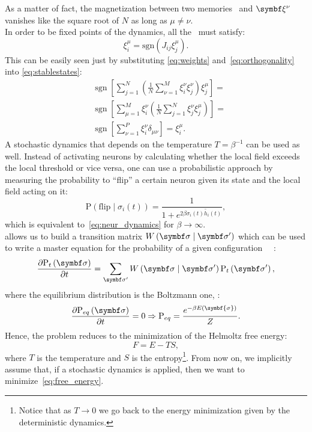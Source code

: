 \documentclass[\rootdir/main.tex]{subfiles}
\begin{document}
As a matter of fact, the magnetization between two memories \bxi\ and $\bxi[\nu]$ vanishes like the square root of $N$ as long as $\mu \neq \nu$.\\
In order to be fixed points of the dynamics, all the \bxi\ must satisfy:
\begin{equation}\label{eq:stablestates}
    \xi_i^{\mu} = \text{sgn}\left(J_{ij}\xi_j^{\mu} \right).
\end{equation}
This can be easily seen just by substituting \cref{eq:weights} and~\cref{eq:orthogonality} into \cref{eq:stablestates}:
\begin{equation}
\begin{split}
    &\operatorname{sgn}\left[\sum_{j=1}^N\left(\frac{1}{N} \sum_{\nu=1}^M \xi_i^\nu \xi_j^\nu\right) \xi_j^\mu\right] = \\
    &\operatorname{sgn}\left[\sum_{\mu=1}^M \xi_i^\nu\left(\frac{1}{N} \sum_{j=1}^N \xi_j^\nu \xi_j^\mu\right)\right] = \\
    & \operatorname{sgn}\left[\sum_{\nu=1}^P \xi_i^\nu \delta_{\mu \nu}\right] = \xi_i^{\mu}.
\end{split}
\end{equation}
A stochastic dynamics that depends on the temperature $T = \beta^{-1}$ can be used as well. Instead of activating neurons by calculating whether the local field exceeds the local threshold or vice versa, one can use a probabilistic approach by measuring the probability to ``flip'' a certain neuron given its state and the local field acting on it:
\begin{equation}\label{eq:stoch_dynamics}
    \mathrm{P}\left( \text{flip} \mid \sigma_i(t) \right) = \frac{1}{1 + e^{2 \beta \sigma_i(t) \tilde{h_i}(t)}},
\end{equation}
which is equivalent to~\cref{eq:neur_dynamics} for $\beta \to \infty$.\\
 allows us to build a transition matrix $W\left( \bsigma \mid \bsigma'\right)$ which can be used to write a master equation for the probability of a given configuration \bsigma\ ~\cite{nishimori}:
\begin{equation}\label{eq:master_eq}
    \frac{\partial \mathrm{P}_t\left(\bsigma\right)}{\partial t} = \sum_{\bsigma'} W\left( \bsigma \mid \bsigma'\right) \mathrm{P}_t\left( \bsigma' \right),
\end{equation}
where the equilibrium distribution is the Boltzmann one, \ie:
\begin{equation}
   \frac{\partial \mathrm{P}_{eq}\left(\bsigma\right)}{\partial t} = 0 \Rightarrow \mathrm{P}_{eq} = \frac{e^{- \beta E(\symbf{\sigma})}}{Z}.
\end{equation}
Hence, the problem reduces to the minimization of the Helmoltz free energy:
\begin{equation}\label{eq:free_energy}
    F = E - TS,
\end{equation}
where $T$ is the temperature and $S$ is the entropy\footnote{Notice that as $T \to 0$ we go back to the energy minimization given by the deterministic dynamics.}. From now on, we implicitly assume that, if a stochastic dynamics is applied, then we want to minimize~\cref{eq:free_energy}.
\end{document}
